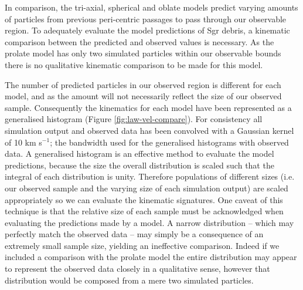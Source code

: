 \documentclass{emulateapj}
\begin{document}
	In comparison, the tri-axial, spherical and oblate models predict varying amounts of particles from previous peri-centric passages to pass through our observable region. To adequately evaluate the model predictions of Sgr debris, a kinematic comparison between the predicted and observed values is necessary. As the prolate model has only two simulated particles within our observable bounds there is no qualitative kinematic comparison to be made for this model.
	
	The number of predicted particles in our observed region is different for each model, and as the amount will not necessarily reflect the size of our observed sample. Consequently the kinematics for each model have been represented as a generalised histogram (Figure \ref{fig:law-vel-compare}). For consistency all simulation output and observed data has been convolved with a Gaussian kernel of 10 km s$^{-1}$; the bandwidth used for the generalised histograms with observed data. A generalised histogram is an effective method to evaluate the model predictions, because the size the overall distribution is scaled such that the integral of each distribution is unity. Therefore populations of different sizes (i.e. our observed sample and the varying size of each simulation output) are scaled appropriately so we can evaluate the kinematic signatures. One caveat of this technique is that the relative size of each sample must be acknowledged when evaluating the predictions made by a model. A narrow distribution \--- which may perfectly match the observed data \--- may simply be a consequence of an extremely small sample size, yielding an ineffective comparison. Indeed if we included a comparison with the prolate model the entire distribution may appear to represent the observed data closely in a qualitative sense, however that distribution would be composed from a mere two simulated particles.
	
\end{document}

